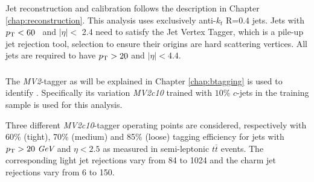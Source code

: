 %
%
%

Jet reconstruction and calibration follows the description in Chapter \ref{chap:reconstruction}.
This analysis uses exclusively anti-$k_t$ R=0.4 jets.
Jets with $p_{{\rm T}} < 60$ \GeV~and $|\eta| <$ 2.4 need to satisfy the
Jet Vertex Tagger, which is a pile-up jet rejection tool\cite{ATLAS-CONF-2014-018}, selection to ensure their origins are hard scattering vertices.
All jets are required to have $p_{{\rm T}}>20$ \GeV and $|\eta|<4.4$.


\subsubsection{\bjets}

\label{sec:vbf-btagging}
The {\it MV2}-tagger as will be explained in Chapter \ref{chap:btagging} is used to identify \bjets. Specifically its variation {\it MV2c10} trained with $10\%$ $c$-jets in the training sample is used for this analysis.


Three different {\it MV2c10}-tagger operating points are considered, respectively with 60\% (tight), 70\% (medium) and 85\% (loose) tagging efficiency for jets
with $p_{{\rm T}} > 20~\textit{GeV}{}$ and $\eta < 2.5$ as measured in semi-leptonic $t\bar{t}$ events. The corresponding light jet rejections vary from 84 to 1024 and the charm jet rejections vary from 6 to 150.

